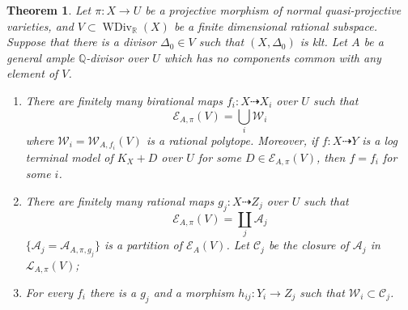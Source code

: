 \documentclass[11pt]{amsart}
\newtheorem{thm}[defn]{Theorem}
\begin{document}
\begin{thm}\label{finitemodel}
\cite[Corollary 1.1.5]{BCHM10} Let $\pi:X\to U$ be a projective morphism of normal quasi-projective varieties,  and $V \subset \operatorname{WDiv}_{\mathbb{R}}(X)$ be a finite dimensional rational subspace. Suppose that there is a divisor $\Delta_{0} \in V$ such that $(X,\Delta_{0})$ is klt. Let $A$ be a general ample $\mathbb{Q}$-divisor over $U$ which has no components common with any element of $V$.  
  \begin{enumerate}
    \item   There are finitely many birational maps $f_{i}:X \dashrightarrow   X_{i}$ over $U$ such that 
      \[
        \mathcal{E}_{A,\pi}(V) =\bigcup_{i}\mathcal{W}_{i}
      \]
      where  $\mathcal{W}_{i}=\mathcal{W}_{A,f_{i}}(V)$ is a rational polytope. Moreover, if  $f:X \dashrightarrow  Y$ is a  log terminal model of $K_{X}+D$ over $U$ for some $D \in \mathcal{E}_{A,\pi}(V)$, then  $f=f_{i}$ for some $i$.  

    \item   There are finitely many rational maps $g_{j}:X \dashrightarrow  Z_{j}$ over $U$ such that
      \[
        \mathcal{E}_{A,\pi}(V) =\coprod_{j}\mathcal{A}_{j}
      \]
      $ \{\mathcal{A}_j=\mathcal{A}_{A,\pi,g_j}\} $ is a partition of $ \mathcal{E}_{A}(V) $. Let $\mathcal{C}_{j}$ be the closure of $\mathcal{A}_{j}$ in $\mathcal{L}_{A,\pi}(V)$;
    \item  For every  $f_{i}$ there is a $g_{j}$ and a morphism $h_{ij}:Y_{i}\to Z_{j}$ such that $\mathcal{W}_{i} \subset \mathcal{C}_{j}$.   
  \end{enumerate}
\end{thm}
\end{document}
